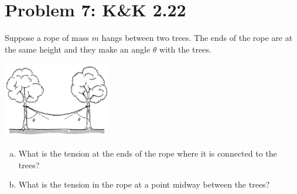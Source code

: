 \documentclass[problems]{esg8012pset}
\begin{document}
\section*{Problem 7: K\&K 2.22}
  Suppose a rope of mass $m$ hangs between two trees. The ends of the rope are at the same height and they make an angle $\theta$ with the trees.
  \begin{center}\includegraphics[width=0.35\textwidth]{ps02_5}\end{center}
  \begin{enumerate}[a)]
    \item What is the tension at the ends of the rope where it is connected to the trees?
    \item What is the tension in the rope at a point midway between the trees?
  \end{enumerate}
\end{document}
